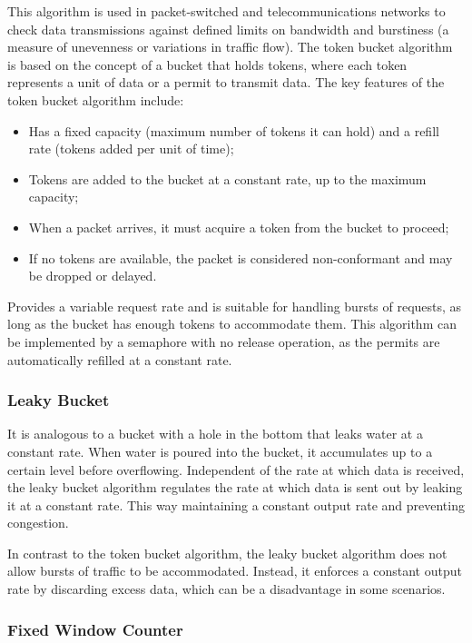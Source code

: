 This algorithm is used in packet-switched and telecommunications networks
to check data transmissions against defined limits on bandwidth and burstiness
(a measure of unevenness or variations in traffic flow).
The token bucket algorithm is based on the concept of a bucket that holds tokens,
where each token represents a unit of data or a permit to transmit data.
The key features of the token bucket algorithm include:

\begin{itemize}
    \item Has a fixed capacity (maximum number of tokens it can hold) and a refill rate (tokens added per unit of time);
    \item Tokens are added to the bucket at a constant rate, up to the maximum capacity;
    \item When a packet arrives, it must acquire a token from the bucket to proceed;
    \item If no tokens are available, the packet is considered non-conformant and may be dropped or delayed.
\end{itemize}

Provides a variable request rate and is suitable for handling bursts of requests,
as long as the bucket has enough tokens to accommodate them.
This algorithm can be implemented by a semaphore with no release operation, as the permits are automatically refilled at a constant rate.

\subsubsection{Leaky Bucket}\label{subsubsec:leaky-bucket-algorithm}

It is analogous to a bucket with a hole in the bottom that leaks water at a constant rate.
When water is poured into the bucket, it accumulates up to a certain level before overflowing.
Independent of the rate at which data is received,
the leaky bucket algorithm regulates the rate at which data is sent out by leaking it at a constant rate.
This way maintaining a constant output rate and preventing congestion.

In contrast to the token bucket algorithm,
the leaky bucket algorithm does not allow bursts of traffic to be accommodated.
Instead, it enforces a constant output rate by discarding excess data, which can be a disadvantage in some scenarios.

\subsubsection{Fixed Window Counter}\label{subsubsec:fixed-window-counter-algorithm}

